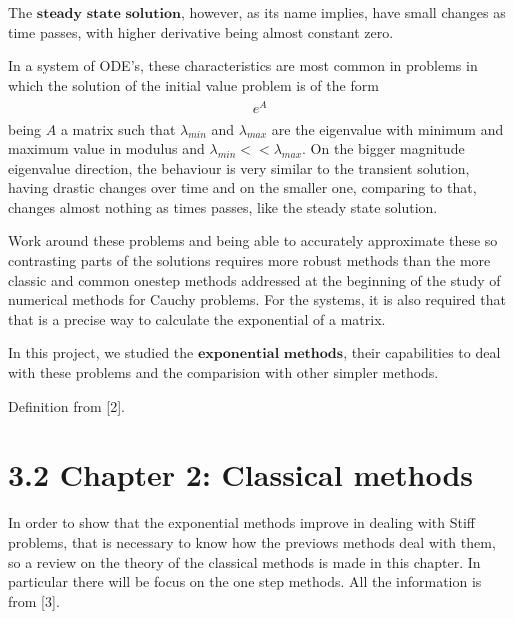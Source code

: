 \documentclass[letterpaper,10pt,english]{jupyterBook}
\begin{document}
\sphinxAtStartPar
The \(\textbf{steady state solution}\), however, as its name implies, have small changes as time passes, with higher derivative being almost constant zero.

\sphinxAtStartPar
In a system of ODE’s, these characteristics are most common in problems in which the solution of the initial value problem is of the form
\begin{equation*}
\begin{split}
\begin{align*}
    e^{A}
\end{align*}
\end{split}
\end{equation*}
\sphinxAtStartPar
being \(A\) a matrix such that \(\lambda_{min}\) and \(\lambda_{max}\) are the eigenvalue with minimum and maximum value in modulus and \(\lambda_{min} << \lambda_{max}\). On the bigger magnitude eigenvalue direction, the behaviour is very similar to the transient solution, having drastic changes over time and on the smaller one, comparing to that, changes almost nothing as times passes, like the steady state solution.

\sphinxAtStartPar
Work around these problems and being able to accurately approximate these so contrasting parts of the solutions requires more robust methods than the more classic and common one\sphinxhyphen{}step methods addressed at the beginning of the study of numerical methods for Cauchy problems. For the systems, it is also required that that is a precise way to calculate the exponential of a matrix.

\sphinxAtStartPar
In this project, we studied the \(\textbf{exponential methods}\), their capabilities to deal with these problems and the comparision with other simpler methods.

\sphinxAtStartPar
Definition from {[}2{]}.

\sphinxstepscope


\section{3.2 Chapter 2: Classical methods}
\label{\detokenize{cap2:chapter-2-classical-methods}}\label{\detokenize{cap2::doc}}
\sphinxAtStartPar
In order to show that the exponential methods improve in dealing with Stiff problems, that is necessary to know how the previows methods deal with them, so a review on the theory of the classical methods is made in this chapter. In particular there will be focus on the one step methods. All the information is from {[}3{]}.
\end{document}
